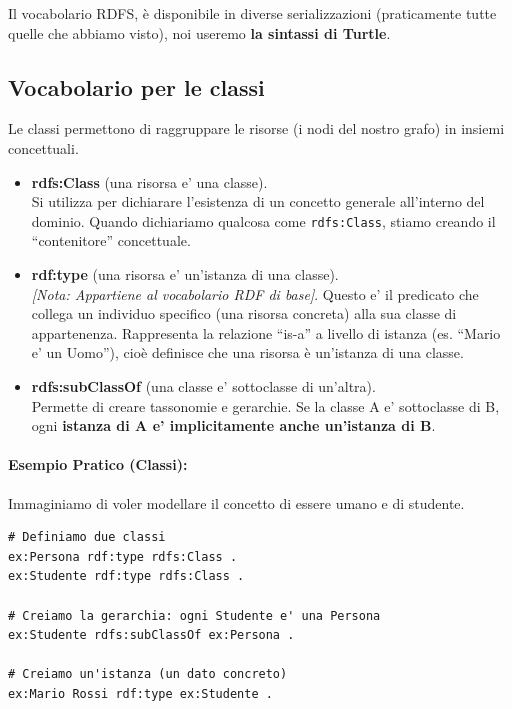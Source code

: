 Il vocabolario RDFS, è disponibile in diverse serializzazioni (praticamente tutte quelle che abbiamo visto), noi useremo \textbf{la sintassi di Turtle}.

\subsection{Vocabolario per le classi}
Le classi permettono di raggruppare le risorse (i nodi del nostro grafo) in insiemi concettuali.

\begin{itemize}
    \item \textbf{rdfs:Class} (una risorsa e' una classe). \\
    Si utilizza per dichiarare l'esistenza di un concetto generale all'interno del dominio. Quando dichiariamo qualcosa come \texttt{rdfs:Class}, stiamo creando il ``contenitore'' concettuale.
    
    \item \textbf{rdf:type} (una risorsa e' un'istanza di una classe). \\
    \textit{[Nota: Appartiene al vocabolario RDF di base]}. Questo e' il predicato che collega un individuo specifico (una risorsa concreta) alla sua classe di appartenenza. Rappresenta la relazione ``is-a'' a livello di istanza (es. ``Mario e' un Uomo''), cioè
    definisce che una risorsa è un'istanza di una classe.
    
    \item \textbf{rdfs:subClassOf} (una classe e' sottoclasse di un'altra). \\
    Permette di creare tassonomie e gerarchie. Se la classe A e' sottoclasse di B, ogni \textbf{istanza di A e' implicitamente anche un'istanza di B}.
\end{itemize}

\paragraph{Esempio Pratico (Classi):}
Immaginiamo di voler modellare il concetto di essere umano e di studente.

\begin{verbatim}
# Definiamo due classi
ex:Persona rdf:type rdfs:Class .
ex:Studente rdf:type rdfs:Class .

# Creiamo la gerarchia: ogni Studente e' una Persona
ex:Studente rdfs:subClassOf ex:Persona .

# Creiamo un'istanza (un dato concreto)
ex:Mario Rossi rdf:type ex:Studente .
\end{verbatim}

